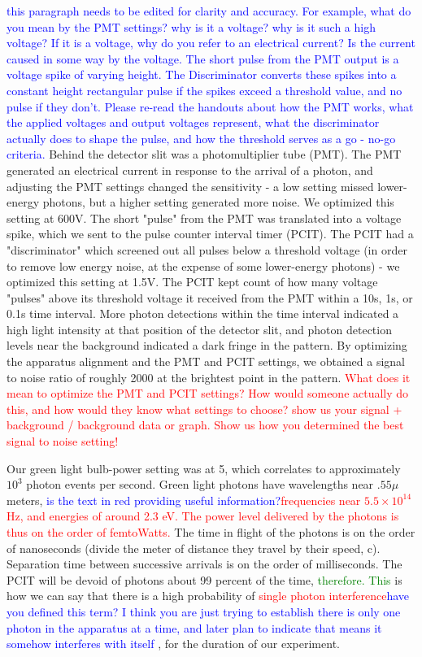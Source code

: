 \documentclass[prb,preprint]{revtex4-1}
\begin{document}
\textcolor{blue}{this paragraph needs to be edited for clarity and accuracy. For example, what do you mean by the PMT settings? why is it a voltage? why is it such a high voltage?  If it is a voltage, why do you refer to an electrical current? Is the current caused in some way by the voltage. The short pulse from the PMT output is a voltage spike of varying height. The Discriminator converts these spikes into a constant height rectangular pulse if the spikes exceed a threshold value, and no pulse if they don't.  Please re-read the handouts about how the PMT works, what the applied voltages and output voltages represent, what the discriminator actually does to shape the pulse, and how the threshold serves as a go - no-go criteria.}
Behind the detector slit was a photomultiplier tube (PMT).  The PMT generated an electrical current in response to the arrival of a photon, and adjusting the PMT settings changed the sensitivity - a low setting missed lower-energy photons, but a higher setting generated more noise.  We optimized this setting at 600V.  The short "pulse" from the PMT was translated into a voltage spike, which we sent to the pulse counter interval timer (PCIT).  The PCIT had a "discriminator" which screened out all pulses below a threshold voltage (in order to remove low energy noise, at the expense of some lower-energy photons) - we optimized this setting at 1.5V. The PCIT kept count of how many voltage "pulses" above its threshold voltage it received from the PMT within a 10s, 1s, or 0.1s time interval. More photon detections within the time interval indicated a high light intensity at that position of the detector slit, and photon detection levels near the background indicated a dark fringe in the pattern. By optimizing the apparatus alignment and the PMT and PCIT settings, we obtained a signal to noise ratio of roughly 2000 at the brightest point in the pattern.  \textcolor{red}{What does it mean to optimize the PMT and PCIT settings? How would someone actually do this, and how would they know what settings to choose? show us your signal + background / background  data or graph. Show us how you determined the best signal to noise setting!} 


Our green light bulb-power setting was at 5, which correlates to approximately $10^{3}$ photon events per second.  Green light photons have wavelengths near $.55 \mu $ meters, \textcolor{blue}{is the text in red providing useful information?}\textcolor{red}{frequencies near $5.5 \times 10^{14} $ Hz, and energies of around 2.3 eV.  The power level delivered by the photons is thus on the order of femtoWatts. }  The time in flight of the photons is on the order of nanoseconds (divide the meter of distance they travel by their speed, c).  Separation time between successive arrivals is on the order of milliseconds.  The PCIT will be devoid of photons about 99 percent of the time, \textcolor{green}{therefore.  This} is how we can say that there is a high probability of \textcolor{red}{single photon interference}\textcolor{blue}{have you defined this term? I think you are just trying to establish there is only one photon in the apparatus at a time, and later plan to indicate that means it somehow interferes with itself} , for the duration of our experiment.
\end{document}

